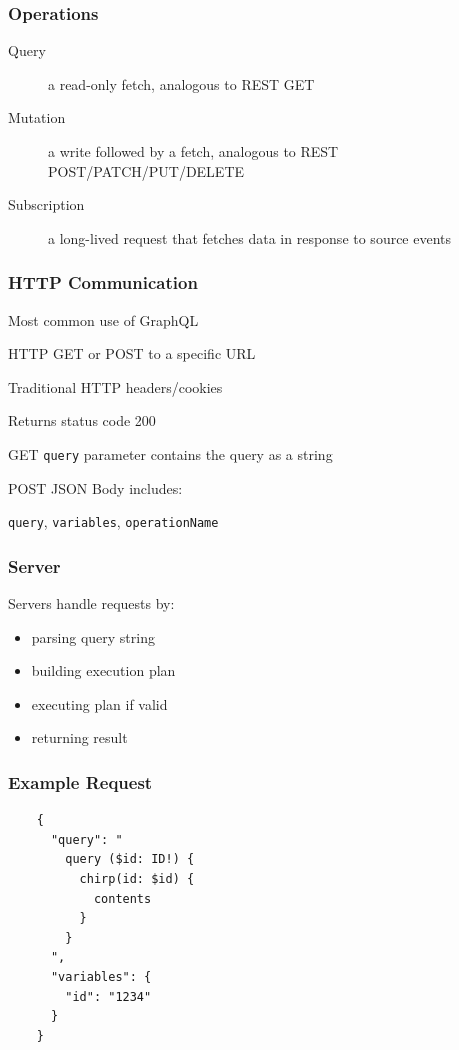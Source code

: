 \documentclass{beamer}
\begin{document}
\begin{frame}
  \frametitle{Operations}
  \begin{description}
  \item[Query] a read-only fetch, analogous to REST GET
  \item[Mutation] a write followed by a fetch, analogous to REST
    POST/PATCH/PUT/DELETE
  \item[Subscription] a long-lived request that fetches data in
    response to source events
  \end{description}
\end{frame}


\begin{frame}
  \frametitle{HTTP Communication}
  Most common use of GraphQL
  
  HTTP GET or POST to a specific URL
  
  Traditional HTTP headers/cookies

  Returns status code 200

  \vspace{1em}
  GET \texttt{query} parameter contains the query as a string
  
  POST JSON Body includes:

  \hspace{1em}\texttt{query}, \texttt{variables}, \texttt{operationName}
\end{frame}


\begin{frame}
  \frametitle{Server}
  Servers handle requests by:

  \begin{itemize}
  \item parsing query string
  \item building execution plan
  \item executing plan if valid
  \item returning result
  \end{itemize}
\end{frame}


\begin{frame}[fragile]
  \frametitle{Example Request}
  \begin{verbatim}
    {
      "query": "
        query ($id: ID!) {
          chirp(id: $id) {
            contents
          }
        }
      ",
      "variables": {
        "id": "1234"
      }
    }
  \end{verbatim}
\end{frame}
\end{document}
